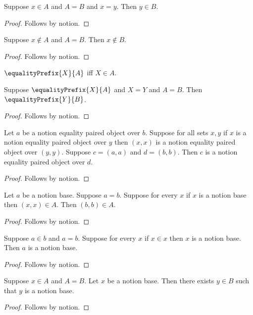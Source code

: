\begin{proposition}\label{notion_equality_membership}
    Suppose $x\in A$ and $A=B$ and $x=y$.
    Then $y\in B$.
\end{proposition}
\begin{proof}
    Follows by notion.
\end{proof}

\begin{proposition}\label{notion_equality_negative_membership}
    Suppose $x\notin A$ and $A=B$.
    Then $x\notin B$.
\end{proposition}
\begin{proof}
    Follows by notion.
\end{proof}

\begin{definition}\label{notion_equality_prefix}
    $\equalityPrefix{X}{A}$ iff $X\in A$.
\end{definition}

\begin{proposition}\label{notion_equality_prefix_transport}
    Suppose $\equalityPrefix{X}{A}$ and $X=Y$ and $A=B$.
    Then $\equalityPrefix{Y}{B}$.
\end{proposition}
\begin{proof}
    Follows by notion.
\end{proof}

\begin{proposition}\label{notion_equality_compound_positions}
    Let $a$ be a notion equality paired object over $b$.
    Suppose for all sets $x,y$ if $x$ is a notion equality paired object over $y$
        then $(x,x)$ is a notion equality paired object over $(y,y)$.
    Suppose $c=(a,a)$ and $d=(b,b)$.
    Then $c$ is a notion equality paired object over $d$.
\end{proposition}
\begin{proof}
    Follows by notion.
\end{proof}

\begin{proposition}\label{notion_equality_concrete_binding}
    Let $a$ be a notion base.
    Suppose $a=b$.
    Suppose for every $x$ if $x$ is a notion base then $(x,x)\in A$.
    Then $(b,b)\in A$.
\end{proposition}
\begin{proof}
    Follows by notion.
\end{proof}

\begin{proposition}\label{notion_equality_repeated_binding}
    Suppose $a\in b$ and $a=b$.
    Suppose for every $x$ if $x\in x$ then $x$ is a notion base.
    Then $a$ is a notion base.
\end{proposition}
\begin{proof}
    Follows by notion.
\end{proof}

\begin{proposition}\label{notion_equality_existential_join}
    Suppose $x\in A$ and $A=B$.
    Let $x$ be a notion base.
    Then there exists $y\in B$ such that $y$ is a notion base.
\end{proposition}
\begin{proof}
    Follows by notion.
\end{proof}

